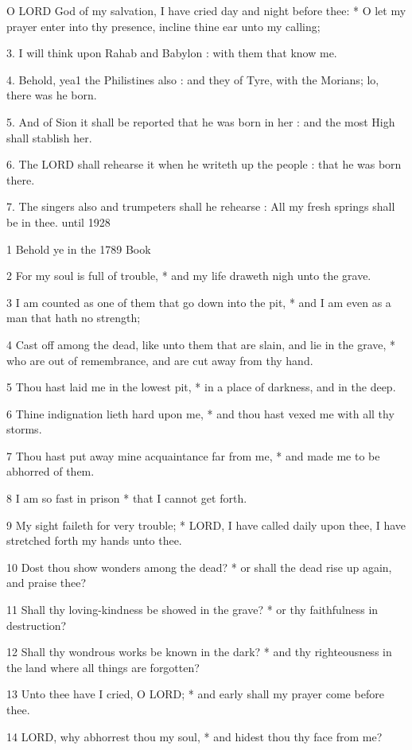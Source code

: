 O
LORD God of my salvation, I have cried day and night before thee: * O
let my prayer enter into thy presence, incline thine ear unto my calling;

3. I will think upon Rahab and Babylon : with them
that know me.

4. Behold, yea1
the Philistines also : and they of Tyre, with the Morians; lo, there was
he born.

5. And of Sion it shall be reported that he was born
in her : and the most High shall stablish her.

6. The LORD shall rehearse it
when he writeth up the people : that he was born there.

7. The singers also and trumpeters shall he rehearse
: All my fresh springs shall be in thee.
until 1928 

1
Behold ye
in the 1789 Book

2 For my soul is full of trouble, * and my life draweth nigh unto the
grave.

3 I am counted as one of them that go down into the
pit, * and I am even as a man that hath no strength;

4 Cast off among the dead, like unto them that are
slain, and lie in the grave, * who are out of remembrance, and are cut
away from thy hand.

5 Thou hast laid me in the lowest pit, * in a place
of darkness, and in the deep.

6 Thine indignation lieth hard upon me, * and thou
hast vexed me with all thy storms.

7 Thou hast put away mine acquaintance far from me,
* and made me to be abhorred of them.

8 I am so fast in prison * that I cannot get forth.

9 My sight faileth for very trouble; * LORD, I have
called daily upon thee, I have stretched forth my hands unto thee.

10 Dost thou show wonders among the dead? * or shall
the dead rise up again, and praise thee?

11 Shall thy loving-kindness be showed in the grave?
* or thy faithfulness in destruction?

12 Shall thy wondrous works be known in the dark? *
and thy righteousness in the land where all things are forgotten?

13 Unto thee have I cried, O LORD; * and early shall
my prayer come before thee.

14 LORD, why abhorrest thou my soul, * and hidest thou
thy face from me?

